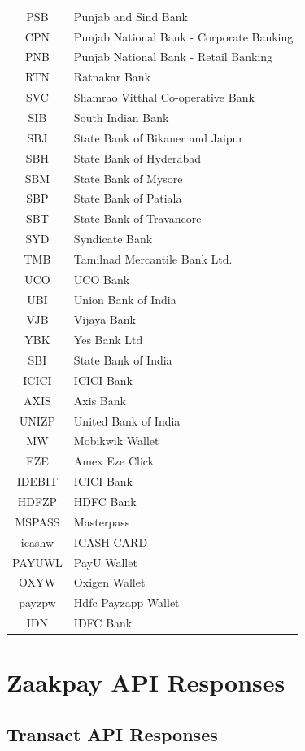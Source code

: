 \documentclass{article}
\begin{document}
\begin{longtable}{||c|p{12.5cm}||}
PSB & Punjab and Sind Bank\\
CPN & Punjab National Bank - Corporate Banking\\
PNB & Punjab National Bank - Retail Banking\\
RTN & Ratnakar Bank\\
SVC & Shamrao Vitthal Co-operative Bank\\
SIB & South Indian Bank\\
SBJ & State Bank of Bikaner and Jaipur\\
SBH & State Bank of Hyderabad\\
SBM & State Bank of Mysore\\
SBP & State Bank of Patiala\\
SBT & State Bank of Travancore\\
SYD & Syndicate Bank\\
TMB & Tamilnad Mercantile Bank Ltd.\\
UCO & UCO Bank\\
UBI & Union Bank of India\\
VJB & Vijaya Bank\\
YBK & Yes Bank Ltd\\
SBI & State Bank of India\\
ICICI & ICICI Bank\\
AXIS & Axis Bank\\
UNIZP & United Bank of India\\
MW & Mobikwik Wallet\\
EZE & Amex Eze Click\\
IDEBIT & ICICI Bank\\
HDFZP & HDFC Bank\\
MSPASS & Masterpass\\
icashw & ICASH CARD\\
PAYUWL & PayU Wallet\\
OXYW & Oxigen Wallet\\
payzpw & Hdfc Payzapp Wallet\\
IDN & IDFC Bank\\
\end{longtable}
\newpage
\section{Zaakpay API Responses}
\subsection{Transact API Responses}
\end{document}
